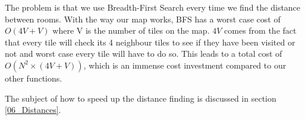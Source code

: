 The problem is that we use Breadth-First Search every time we find the distance between rooms. With the way our map works, BFS has a worst case cost of $O(4V + V)$ where V is the number of tiles on the map. $4V$ comes from the fact that every tile will check its 4 neighbour tiles to see if they have been visited or not and worst case every tile will have to do so. This leads to a total cost of $O(N^2 \times (4V + V))$, which is an immense cost investment compared to our other functions.

The subject of how to speed up the distance finding is discussed in section \ref{06_Distances}.





